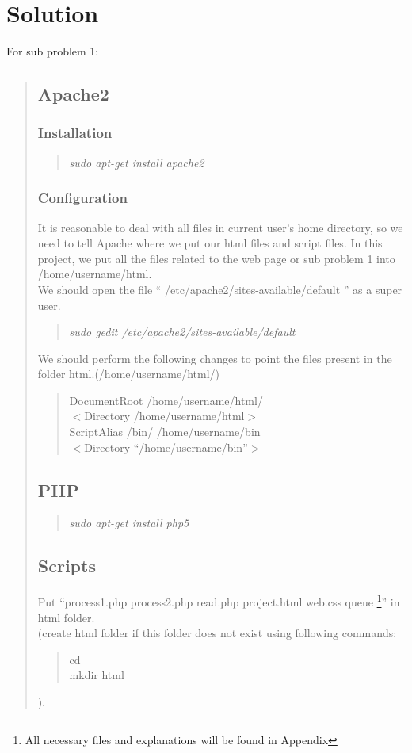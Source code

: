 \section*{Solution}
For sub problem 1:
\begin{quote}
\subsection{Apache2}
\subsubsection*{Installation}
\begin{quote}
\emph{sudo apt-get install apache2}
\end{quote}
\subsubsection*{Configuration}
It is reasonable to deal with all files in current user's home directory, so we need to tell Apache where we put our html files and script files. In this project, we put all the files related to the web page or sub problem 1 into /home/username/html. \\
We should open the file `` /etc/apache2/sites-available/default '' as a super user.
\begin{quote}
\emph{sudo gedit /etc/apache2/sites-available/default}
\end{quote}
We should perform the following changes to point the files present in the folder html.(/home/username/html/)
\begin{quote}
DocumentRoot /home/username/html/ \\
$<$Directory /home/username/html$>$ \\
ScriptAlias /bin/ /home/username/bin \\
$<$Directory ``/home/username/bin''$>$  \\
\end{quote}
\subsection{PHP}
\begin{quote}
\emph{sudo apt-get install php5}
\end{quote}
\subsection{Scripts}
Put ``process1.php process2.php read.php project.html web.css queue \footnote{All necessary files and explanations will be found in Appendix}'' in html folder. \\
(create html folder if this folder does not exist using following commands:
\begin{quote}
cd\\
mkdir html
\end{quote}).
\end{quote}
